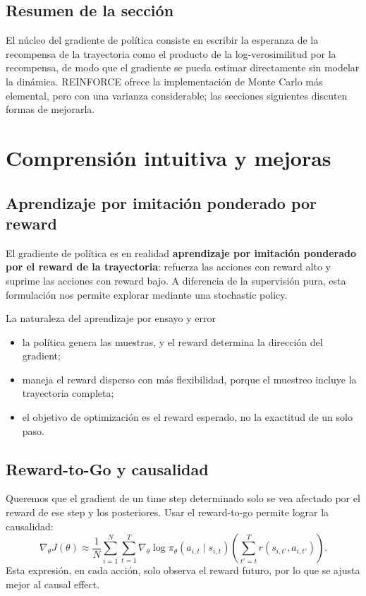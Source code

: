 \documentclass[a4paper]{article}
\begin{document}
\subsection{Resumen de la sección}

El núcleo del gradiente de política consiste en escribir la esperanza de la recompensa de la trayectoria como el producto de la log-verosimilitud por la recompensa, de modo que el gradiente se pueda estimar directamente sin modelar la dinámica. REINFORCE ofrece la implementación de Monte Carlo más elemental, pero con una varianza considerable; las secciones siguientes discuten formas de mejorarla.
\section{Comprensión intuitiva y mejoras}

\subsection{Aprendizaje por imitación ponderado por reward}

El gradiente de política es en realidad \textbf{aprendizaje por imitación ponderado por el reward de la trayectoria}: refuerza las acciones con reward alto y suprime las acciones con reward bajo. A diferencia de la supervisión pura, esta formulación nos permite explorar mediante una stochastic policy.

\begin{knowledgebox}{La naturaleza del aprendizaje por ensayo y error}
\begin{itemize}
    \item la política genera las muestras, y el reward determina la dirección del gradient;
    \item maneja el reward disperso con más flexibilidad, porque el muestreo incluye la trayectoria completa;
    \item el objetivo de optimización es el reward esperado, no la exactitud de un solo paso.
\end{itemize}
\end{knowledgebox}

\subsection{Reward-to-Go y causalidad}

Queremos que el gradient de un time step determinado solo se vea afectado por el reward de ese step y los posteriores. Usar el reward-to-go permite lograr la causalidad:
$$\nabla_\theta J(\theta) \approx \frac{1}{N}\sum_{i=1}^{N}\sum_{t=1}^{T} \nabla_\theta \log \pi_\theta(a_{i,t} \mid s_{i,t}) \left(\sum_{t'=t}^{T} r(s_{i,t'}, a_{i,t'}) \right).$$
Esta expresión, en cada acción, solo observa el reward futuro, por lo que se ajusta mejor al causal effect.
\end{document}
